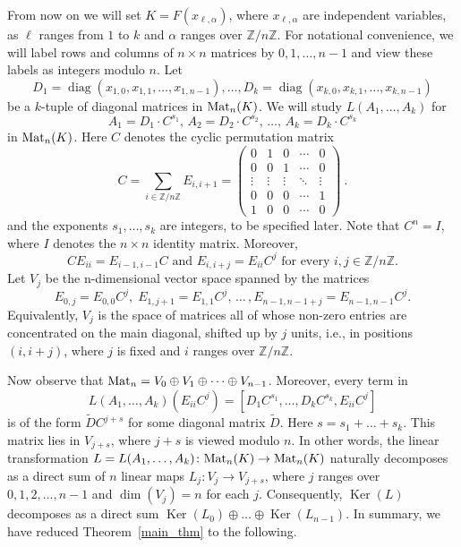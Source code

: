 \documentclass{amsproc}
\theoremstyle{definition}
\theoremstyle{remark}
\numberwithin{equation}{section}
\newcommand{\bbZ}{{\mathbb Z}}
\newcommand{\Ker}{\operatorname{Ker}}
\newcommand{\diag}{\operatorname{diag}}
\newcommand{\M}{{\rm Mat}}
\begin{document}
   From now on we will set $K= F(x_{\ell, \alpha})$, where $x_{\ell, \alpha}$ are independent variables, 
as $\ell$ ranges from $1$ to $k$ and $\alpha$ ranges over $\bbZ/ n \bbZ$. For notational convenience, we will
label rows and columns of $n \times n$ matrices by $0, 1, \ldots, n-1$ and view these labels as integers modulo $n$.
Let
\begin{equation} \label{e.D}
D_1 = \diag(x_{1, 0}, x_{1, 1}, \ldots, x_{1, n-1}), \ldots,
D_k = \diag(x_{k, 0}, x_{k, 1}, \ldots, x_{k, n-1})
\end{equation}
be a $k$-tuple of diagonal matrices in $\M_n(K)$.
We will study $L(A_1, \ldots, A_k)$ for %
\begin{equation} \label{e.A_i} 
\text{$A_{1} = D_{1} \cdot C^{s_1}$, $A_{2} = D_{2} \cdot C^{s_2}$, \ldots, $A_{k} = D_{k} \cdot C^{s_k}$} 
\end{equation}
in $\M_n(K)$. Here $C$ denotes the cyclic permutation matrix 
\begin{equation} \label{e.C}  C= \sum_{i \in \mathbb Z/n \mathbb Z} E_{i, i+1} = \left(\begin{array}{ccccc}
0&1&0&\cdots&0\\
0&0&1&\cdots&0\\
\vdots&\vdots&\vdots&\ddots&\vdots\\
0&0&0&\cdots&1\\
1&0&0&\cdots&0
\end{array}\right)\ . \end{equation} 
and the exponents $s_1, \dots, s_k$ are integers, to be specified later. Note that $C^n = I$, where $I$ denotes the $n \times n$ identity matrix.
Moreover, 
\[ \text{$CE_{ii}=E_{i-1, i-1}C$ and $E_{i, i + j} = E_{ii} C^j$ for every $i, j \in \mathbb Z / n \mathbb Z$.} \]
Let $V_j$ be the n-dimensional vector space spanned by the matrices
\begin{equation} \label{e.basis}
E_{0, j} = E_{0, 0} C^j, \; E_{1, j + 1} = E_{1, 1} C^j, \,  \ldots \, , E_{n - 1, n - 1 + j} = E_{n-1, n-1} C^j .
\end{equation}
Equivalently, $V_j$ is the space of matrices all of whose non-zero entries 
are concentrated on the main diagonal, shifted up by $j$ units,
i.e., in positions $(i, i + j)$, where $j$ is fixed and $i$ ranges over $\mathbb Z/ n \mathbb Z$. 

Now observe that $\M_n=V_0\oplus V_1\oplus\cdots\oplus V_{n-1}$. Moreover, every term in
\[L(A_1,\dots,A_k)(E_{i i}C^j)=[D_1C^{s_1},\dots,D_kC^{s_k},E_{ii}C^j]\]
is of the form ${\tilde D}C^{j + s}$ for some diagonal matrix ${\tilde D}$. Here $s = s_1 + \ldots + s_k$.
This matrix lies in $V_{j+s}$, where $j+s$ is viewed modulo $n$. In other words, the linear transformation
$L = L(A_1, \ldots, A_k) \colon \M_n(K) \to \M_n(K)$ naturally decomposes as a direct sum of $n$ linear maps 
$L_j \colon V_j \to V_{j + s}$, where $j$ ranges over $0,1,2,\ldots, n-1$ and $\dim(V_j) = n$ for each $j$.
Consequently, $\Ker(L)$ decomposes as a direct sum
$\Ker(L_0) \oplus \ldots \oplus \Ker(L_{n-1})$. In summary, we have reduced Theorem~\ref{main_thm} to the following.
\end{document}
